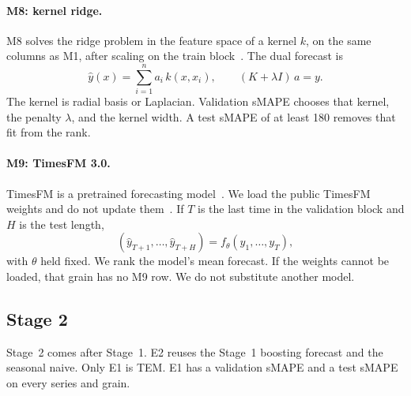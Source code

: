 \paragraph{M8: kernel ridge.}
M8 solves the ridge problem in the feature space of a kernel $k$, on the same columns as M1, after scaling on the train block~\citep{murphy2012ml}.
The dual forecast is
\begin{equation}
  \hat y(x) = \sum_{i=1}^{n} a_i\, k(x, x_i),
  \qquad
  (K + \lambda I)\, a = y.
  \label{eq:krr}
\end{equation}
The kernel is radial basis or Laplacian.
Validation sMAPE chooses that kernel, the penalty $\lambda$, and the kernel width.
A test sMAPE of at least 180 removes that fit from the rank.

\paragraph{M9: TimesFM 3.0.}
TimesFM is a pretrained forecasting model~\citep{das2024timesfm}.
We load the public TimesFM weights and do not update them~\citep{das2024timesfm}.
If $T$ is the last time in the validation block and $H$ is the test length,
\begin{equation}
  (\hat y_{T+1},\ldots,\hat y_{T+H})
  = f_{\theta}(y_1,\ldots,y_T),
  \label{eq:timesfm}
\end{equation}
with $\theta$ held fixed.
We rank the model's mean forecast.
If the weights cannot be loaded, that grain has no M9 row.
We do not substitute another model.

\subsection{Stage 2}

Stage~2 comes after Stage~1.
E2 reuses the Stage~1 boosting forecast and the seasonal naive.
Only E1 is TEM.
E1 has a validation sMAPE and a test sMAPE on every series and grain.

